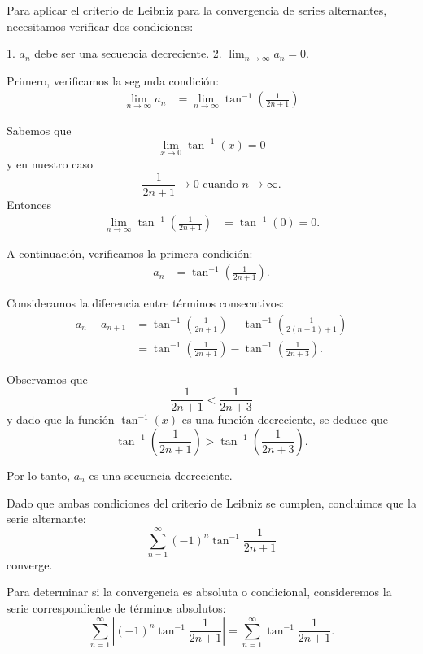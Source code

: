 \documentclass{article}
\begin{document}
    Para aplicar el criterio de Leibniz para la convergencia de series alternantes, necesitamos verificar dos condiciones:

    1. \( a_{n} \) debe ser una secuencia decreciente.
    2. \( \lim_{n \to \infty} a_{n} = 0 \).

    Primero, verificamos la segunda condición:
    \begin{align*}
    \lim_{n \to \infty} a_{n} &= \lim_{n \to \infty} \tan^{-1}\left(\frac{1}{2n+1}\right)
    \end{align*}

    Sabemos que
    $$
    \lim_{x \to 0} \tan^{-1}(x) = 0
    $$
    y en nuestro caso
    $$
    \frac{1}{2n+1} \to 0 \text{ cuando } n \to \infty.
    $$
    Entonces
    \begin{align*}
    \lim_{n \to \infty} \tan^{-1}\left(\frac{1}{2n+1}\right) &= \tan^{-1}(0) = 0.
    \end{align*}

    A continuación, verificamos la primera condición:
    \begin{align*}
    a_{n} &= \tan^{-1} \left(\frac{1}{2n+1}\right).
    \end{align*}

    Consideramos la diferencia entre términos consecutivos:
    \begin{align*}
    a_{n} - a_{n+1} &= \tan^{-1} \left(\frac{1}{2n+1}\right) - \tan^{-1} \left(\frac{1}{2(n+1)+1}\right) \\
    &= \tan^{-1} \left(\frac{1}{2n+1}\right) - \tan^{-1} \left(\frac{1}{2n+3}\right).
    \end{align*}

    Observamos que
    $$
    \frac{1}{2n+1} < \frac{1}{2n+3}
    $$
    y dado que la función \( \tan^{-1}(x) \) es una función decreciente, se deduce que
    $$
    \tan^{-1}\left(\frac{1}{2n+1}\right) > \tan^{-1}\left(\frac{1}{2n+3}\right).
    $$

    Por lo tanto, \( a_{n} \) es una secuencia decreciente.

    Dado que ambas condiciones del criterio de Leibniz se cumplen, concluimos que la serie alternante:
    $$
    \sum_{n=1}^{\infty}(-1)^{n} \tan^{-1} \frac{1}{2n+1}
    $$
    converge.

    Para determinar si la convergencia es absoluta o condicional, consideremos la serie correspondiente de términos absolutos:
    $$
    \sum_{n=1}^{\infty} \left|(-1)^{n} \tan^{-1} \frac{1}{2n+1}\right| = \sum_{n=1}^{\infty} \tan^{-1} \frac{1}{2n+1}.
    $$
\end{document}
